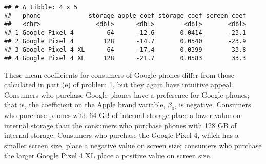\documentclass[11pt,letterpaper]{article}\usepackage[]{graphicx}\usepackage[]{color}
\makeatletter
\newenvironment{kframe}{%
 \def\at@end@of@kframe{}%
 \ifinner\ifhmode%
  \def\at@end@of@kframe{\end{minipage}}%
  \begin{minipage}{\columnwidth}%
 \fi\fi%
 \def\FrameCommand##1{\hskip\@totalleftmargin \hskip-\fboxsep
 \colorbox{shadecolor}{##1}\hskip-\fboxsep
     \hskip-\linewidth \hskip-\@totalleftmargin \hskip\columnwidth}%
 \MakeFramed {\advance\hsize-\width
   \@totalleftmargin\z@ \linewidth\hsize
   \@setminipage}}%
 {\par\unskip\endMakeFramed%
 \at@end@of@kframe}
\newenvironment{knitrout}{}{} %
\makeatother
\begin{document}
\begin{enumerate}[label=\alph*., leftmargin=*]
\begin{knitrout}
\begin{kframe}
\begin{verbatim}
## # A tibble: 4 x 5
##   phone             storage apple_coef storage_coef screen_coef
##   <chr>               <dbl>      <dbl>        <dbl>       <dbl>
## 1 Google Pixel 4         64      -12.6       0.0414       -23.1
## 2 Google Pixel 4        128      -14.7       0.0540       -23.9
## 3 Google Pixel 4 XL      64      -17.4       0.0399        33.8
## 4 Google Pixel 4 XL     128      -21.7       0.0583        33.3
\end{verbatim}
\end{kframe}
\end{knitrout}

	These mean coefficients for consumers of Google phones differ from those calculated in part (e) of problem 1, but they again have intuitive appeal. Consumers who purchase Google phones have a preference for Google phones; that is, the coefficient on the Apple brand variable, $\beta_0$, is negative. Consumers who purchase phones with 64 GB of internal storage place a lower value on internal storage than the consumers who purchase phones with 128 GB of internal storage. Consumers who purchase the Google Pixel 4, which has a smaller screen size, place a negative value on screen size; consumers who purchase the larger Google Pixel 4 XL place a positive value on screen size.


\end{enumerate}
\end{document}
